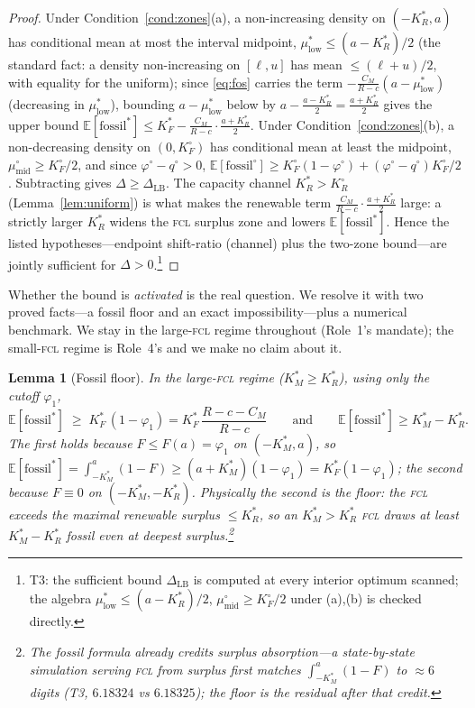 \documentclass[11pt,reqno]{amsart}
\theoremstyle{plain}
\newtheorem{lemma}{Lemma}
\theoremstyle{definition}
\theoremstyle{remark}
\newcommand{\KRs}{K_R^{*}}
\newcommand{\KFs}{K_F^{*}}
\newcommand{\KMs}{K_M^{*}}
\newcommand{\KRo}{K_R^{\circ}}
\newcommand{\KFo}{K_F^{\circ}}
\newcommand{\CM}{C_M}
\newcommand{\E}{\mathbb{E}}
\begin{document}
\begin{proof}
Under Condition~\ref{cond:zones}(a), a non-increasing density on $(-\KRs,a)$ has
conditional mean at most the interval midpoint, $\mu^{*}_{\mathrm{low}}\le(a-\KRs)/2$
(the standard fact: a density non-increasing on $[\ell,u]$ has mean $\le(\ell+u)/2$,
with equality for the uniform);
since \eqref{eq:fos} carries the term $-\frac{\CM}{R-c}(a-\mu^{*}_{\mathrm{low}})$
(decreasing in $\mu^{*}_{\mathrm{low}}$), bounding $a-\mu^{*}_{\mathrm{low}}$ below by
$a-\frac{a-\KRs}{2}=\frac{a+\KRs}{2}$ gives the upper bound
$\E[\text{fossil}^{*}]\le\KFs-\frac{\CM}{R-c}\cdot\frac{a+\KRs}{2}$.
Under Condition~\ref{cond:zones}(b), a non-decreasing density on $(0,\KFo)$ has
conditional mean at least the midpoint, $\mu^{\circ}_{\mathrm{mid}}\ge\KFo/2$,
and since $\varphi^{\circ}-q^{\circ}>0$,
$\E[\text{fossil}^{\circ}]\ge\KFo(1-\varphi^{\circ})+(\varphi^{\circ}-q^{\circ})\KFo/2$.
Subtracting gives $\Delta\ge\Delta_{\mathrm{LB}}$. The capacity channel
$\KRs>\KRo$ (Lemma~\ref{lem:uniform}) is what makes the renewable term
$\frac{\CM}{R-c}\cdot\frac{a+\KRs}{2}$ large: a strictly larger $\KRs$ widens the
\textsc{fcl} surplus zone and lowers $\E[\text{fossil}^{*}]$. Hence the listed
hypotheses---endpoint shift-ratio (channel) plus the two-zone bound---are
jointly sufficient for $\Delta>0$.\footnote{T3: the sufficient bound
$\Delta_{\mathrm{LB}}$ is computed at every interior optimum scanned; the algebra
$\mu^{*}_{\mathrm{low}}\le(a-\KRs)/2$, $\mu^{\circ}_{\mathrm{mid}}\ge\KFo/2$ under
(a),(b) is checked directly.}
\end{proof}

Whether the bound is \emph{activated} is the real question. We resolve it with two
proved facts---a fossil floor and an exact impossibility---plus a numerical
benchmark. We stay in the large-\textsc{fcl} regime throughout (Role~1's mandate);
the small-\textsc{fcl} regime is Role~4's and we make no claim about it.

\begin{lemma}[Fossil floor]\label{lem:floor}
In the large-\textsc{fcl} regime ($\KMs\ge\KRs$), using only the cutoff $\varphi_1$,
\begin{equation}\label{eq:floor}
  \E[\text{fossil}^{*}]\;\ge\;\KFs\,(1-\varphi_1)=\KFs\,\frac{R-c-\CM}{R-c}
  \qquad\text{and}\qquad \E[\text{fossil}^{*}]\ge\KMs-\KRs .
\end{equation}
The first holds because $F\le F(a)=\varphi_1$ on $(-\KMs,a)$, so
$\E[\text{fossil}^{*}]=\int_{-\KMs}^{a}(1-F)\ge(a+\KMs)(1-\varphi_1)=\KFs(1-\varphi_1)$;
the second because $F\equiv0$ on $(-\KMs,-\KRs)$. Physically the second is the
\emph{floor}: the \textsc{fcl} exceeds the maximal renewable surplus $\le\KRs$, so
an $\KMs>\KRs$ \textsc{fcl} draws at least $\KMs-\KRs$ fossil even at deepest
surplus.\footnote{The fossil formula already credits surplus absorption---a
state-by-state simulation serving \textsc{fcl} from surplus first matches
$\int_{-\KMs}^{a}(1-F)$ to $\approx6$ digits (T3, $6.18324$ vs $6.18325$); the floor
is the \emph{residual} after that credit.}
\end{lemma}
\end{document}
